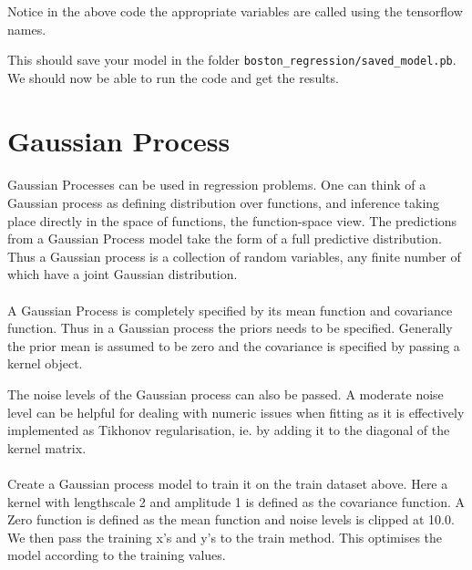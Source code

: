 \documentclass{book}
\begin{document}
Notice in the above code the appropriate variables are called using the tensorflow names.

This should save your model in the folder \lstinline{boston_regression/saved_model.pb}. We should now be able to run the code and get the results.

\label{par:}

\label{par:tensorflow}

\label{sub:linear_regression_with_ols_and_gradient_descent}

\section{Gaussian Process}%
\paragraph{}%
Gaussian Processes can be used in regression problems. One can think of a Gaussian process as defining distribution over functions, and inference taking place directly in the space of functions, the function-space view. The predictions from a Gaussian Process model take the form of a full predictive distribution. Thus a Gaussian  process is a collection of random variables, any finite number of which have a joint Gaussian distribution.
\label{par:}
\paragraph{}%
A Gaussian Process is completely specified by its mean function and covariance function. Thus in a Gaussian process the priors needs to be  specified. Generally the prior mean is assumed to be zero and the covariance is specified by passing a kernel object.

The noise levels of the Gaussian process can also be passed. A moderate noise level can be helpful for dealing with numeric issues when fitting as it is effectively implemented as Tikhonov regularisation, ie. by adding it to the diagonal of the kernel matrix.
\label{par:}

\paragraph{}%
Create a Gaussian process model to train it on the train dataset above. Here a kernel with lengthscale 2 and amplitude 1 is defined as the covariance function. A Zero function is defined as the mean function and noise levels is clipped at 10.0. We then pass the training x’s and y’s to the train method. This optimises the model according to the training values.
\label{par:}
\end{document}

